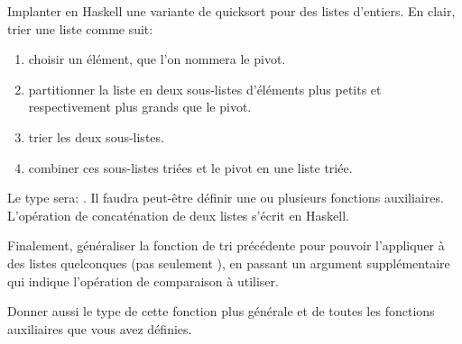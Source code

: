 \begin{Exercise}[title={Quicksort en Haskell}]
  \label{ex:quicksort_haskell}
Implanter en Haskell une variante de quicksort pour des listes
d'entiers.  En clair, trier une liste comme suit:
\begin{enumerate}
\item choisir un élément, que l'on nommera le pivot.
\item partitionner la liste en deux sous-listes d'éléments plus
  petits et respectivement plus grands que le pivot.
\item trier les deux sous-listes.
\item combiner ces sous-listes triées et le pivot en une liste triée.
\end{enumerate}
Le type sera: . Il faudra
peut-être définir une ou plusieurs fonctions auxiliaires. L'opération
de concaténation de deux listes s'écrit \haskellinline{++} en Haskell.

Finalement, généraliser la fonction de tri précédente pour pouvoir
l'appliquer à des listes quelconques (pas seulement
), en passant un argument supplémentaire qui
indique l'opération de comparaison à utiliser.

Donner aussi le type de cette fonction plus générale et de toutes les
fonctions auxiliaires que vous avez définies.
\end{Exercise}

\begin{Answer}[ref={ex:quicksort_haskell}]
\end{Answer}
